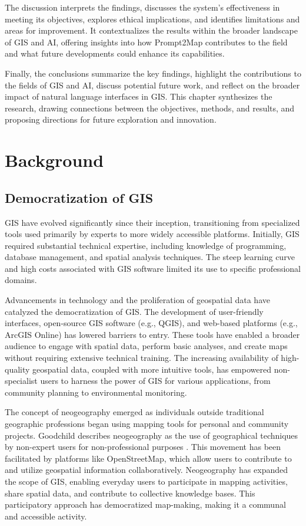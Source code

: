The discussion interprets the findings, discusses the system's effectiveness in meeting its objectives, explores ethical implications, and identifies limitations and areas for improvement. It contextualizes the results within the broader landscape of GIS and AI, offering insights into how Prompt2Map contributes to the field and what future developments could enhance its capabilities.

Finally, the conclusions summarize the key findings, highlight the contributions to the fields of GIS and AI, discuss potential future work, and reflect on the broader impact of natural language interfaces in GIS. This chapter synthesizes the research, drawing connections between the objectives, methods, and results, and proposing directions for future exploration and innovation.

\section{Background}

\subsection{Democratization of GIS}

GIS have evolved significantly since their inception, transitioning from specialized tools used primarily by experts to more widely accessible platforms. Initially, GIS required substantial technical expertise, including knowledge of programming, database management, and spatial analysis techniques. The steep learning curve and high costs associated with GIS software limited its use to specific professional domains.

Advancements in technology and the proliferation of geospatial data have catalyzed the democratization of GIS. The development of user-friendly interfaces, open-source GIS software (e.g., QGIS), and web-based platforms (e.g., ArcGIS Online) has lowered barriers to entry. These tools have enabled a broader audience to engage with spatial data, perform basic analyses, and create maps without requiring extensive technical training. The increasing availability of high-quality geospatial data, coupled with more intuitive tools, has empowered non-specialist users to harness the power of GIS for various applications, from community planning to environmental monitoring.

The concept of neogeography emerged as individuals outside traditional geographic professions began using mapping tools for personal and community projects. Goodchild describes neogeography as the use of geographical techniques by non-expert users for non-professional purposes \cite{goodchild_neogeography_2009}. This movement has been facilitated by platforms like  OpenStreetMap, which allow users to contribute to and utilize geospatial information collaboratively. Neogeography has expanded the scope of GIS, enabling everyday users to participate in mapping activities, share spatial data, and contribute to collective knowledge bases. This participatory approach has democratized map-making, making it a communal and accessible activity.

